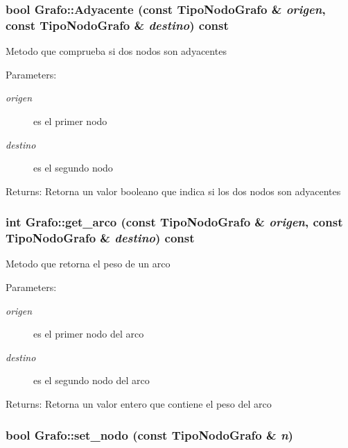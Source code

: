 \subsubsection{\setlength{\rightskip}{0pt plus 5cm}bool Grafo::Adyacente (const {\bf TipoNodoGrafo} \& {\em origen}, const {\bf TipoNodoGrafo} \& {\em destino}) const}\label{classGrafo_f4a79e0c0678ecd61759570bdb42a773}


Metodo que comprueba si dos nodos son adyacentes \begin{Desc}
\item[Parameters:]
\begin{description}
\item[{\em origen}]es el primer nodo \item[{\em destino}]es el segundo nodo \end{description}
\end{Desc}
\begin{Desc}
\item[Returns:]Retorna un valor booleano que indica si los dos nodos son adyacentes \end{Desc}
\subsubsection{\setlength{\rightskip}{0pt plus 5cm}int Grafo::get\_\-arco (const {\bf TipoNodoGrafo} \& {\em origen}, const {\bf TipoNodoGrafo} \& {\em destino}) const}\label{classGrafo_6f7d1daa75771801a8cb5b15869ba72d}


Metodo que retorna el peso de un arco \begin{Desc}
\item[Parameters:]
\begin{description}
\item[{\em origen}]es el primer nodo del arco \item[{\em destino}]es el segundo nodo del arco \end{description}
\end{Desc}
\begin{Desc}
\item[Returns:]Retorna un valor entero que contiene el peso del arco \end{Desc}
\subsubsection{\setlength{\rightskip}{0pt plus 5cm}bool Grafo::set\_\-nodo (const {\bf TipoNodoGrafo} \& {\em n})}\label{classGrafo_6333bfcd9102154c2ca00effd457ac76}


